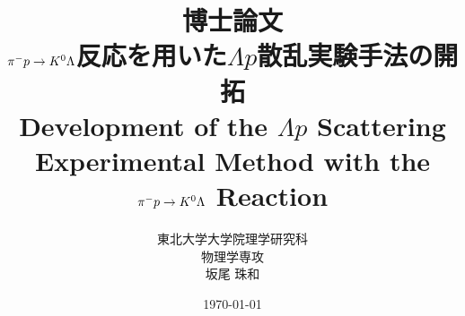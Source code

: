 %

\title{
博士論文 \\
\vspace{30pt}
$\pi^- p \to K^0 \Lambda$反応を用いた$\Lambda p$散乱実験手法の開拓\\
\vspace{30pt}
Development of the $\Lambda p$ Scattering Experimental Method with the $\pi^- p \to K^0 \Lambda$ Reaction\\
}

\author{東北大学大学院理学研究科 \\ \vspace{20pt} 物理学専攻 \\ \vspace{20pt} 坂尾 珠和}
\date{\today}
\maketitle
\thispagestyle{empty}
%
